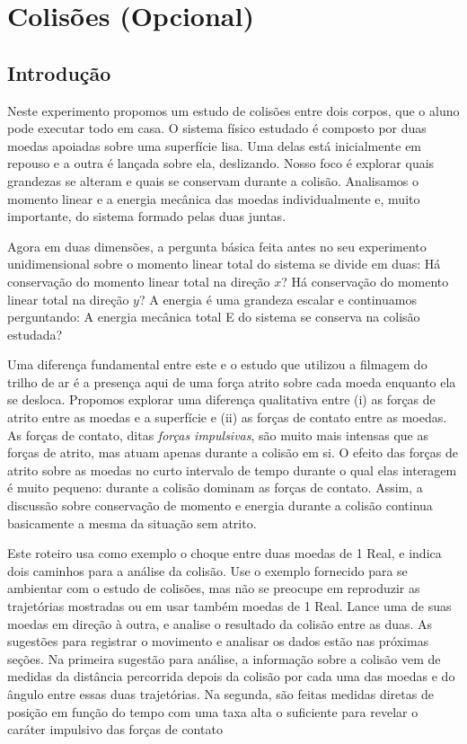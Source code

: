 \chapter{Colisões (Opcional)}
\label{chap:colisaoopcional}
\vspace{-0.7cm}
\thispagestyle{empty}
\section{Introdução}

Neste experimento propomos um estudo de colisões entre dois corpos, que o aluno pode executar todo em casa. O sistema físico estudado é composto por duas moedas apoiadas sobre uma superfície lisa. Uma delas está inicialmente em repouso e a outra é lançada sobre ela, deslizando. Nosso foco é explorar quais grandezas se alteram e quais se conservam durante a colisão. Analisamos o momento linear e a energia mecânica das moedas individualmente e, muito importante, do sistema formado pelas duas juntas.

Agora em duas dimensões, a pergunta básica feita antes no seu experimento unidimensional sobre o momento linear total do sistema se divide em duas: Há conservação do momento linear total na direção $x$? Há conservação do momento linear total na direção $y$? A energia é uma grandeza escalar e continuamos perguntando: A energia mecânica total E do sistema se conserva na colisão estudada? 

Uma diferença fundamental entre este e o estudo que utilizou a filmagem do trilho de ar é a presença aqui de uma força atrito sobre cada moeda enquanto ela se desloca. Propomos explorar uma diferença qualitativa entre (i) as forças de atrito entre as moedas e a superfície e (ii) as forças de contato entre as moedas. As forças de contato, ditas {\it forças impulsivas}, são muito mais intensas que as forças de atrito, mas atuam apenas durante a colisão em si. O efeito das forças de atrito sobre as moedas no curto intervalo de tempo durante o qual elas interagem é muito pequeno: durante a colisão dominam as forças de contato. Assim, a discussão sobre conservação de momento e energia durante a colisão continua basicamente a mesma da situação sem atrito.

Este roteiro usa como exemplo o choque entre duas moedas de 1 Real, e indica dois caminhos para a análise da colisão. Use o exemplo fornecido para se ambientar com o estudo de colisões, mas não se preocupe em reproduzir as trajetórias mostradas ou em usar também moedas de 1 Real. Lance uma de suas moedas em direção à outra, e analise o resultado da colisão entre as duas. As sugestões para registrar o movimento e analisar os dados estão nas próximas seções. Na primeira sugestão para análise, a informação sobre a colisão vem de medidas da distância percorrida depois da colisão por cada uma das moedas \cite{Galante2020} e do ângulo entre essas duas trajetórias.  Na segunda, são feitas medidas diretas de posição em função do tempo com uma taxa alta o suficiente para revelar o caráter impulsivo das forças de contato~\cite{deJesus2016}

